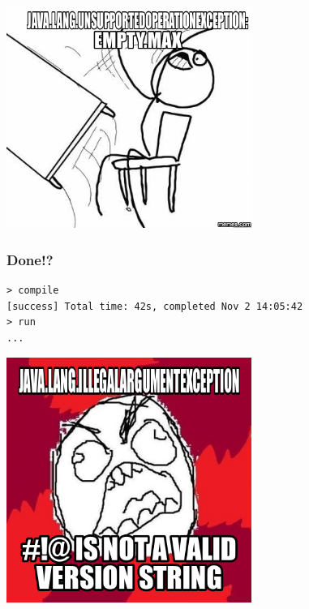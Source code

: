 \documentclass{beamer}
\begin{document}
\begin{frame}
  \begin{center}
    \includegraphics[width=0.6\textwidth]{../pics/unsupported.png}
  \end{center}
\end{frame}

\begin{frame}[fragile]
  \frametitle{Done!?}
\begin{verbatim}
> compile
[success] Total time: 42s, completed Nov 2 14:05:42
> run
...
\end{verbatim}
\end{frame}

\begin{frame}
  \begin{center}
    \includegraphics[width=0.6\textwidth]{../pics/iae.png}
  \end{center}
\end{frame}
\end{document}
